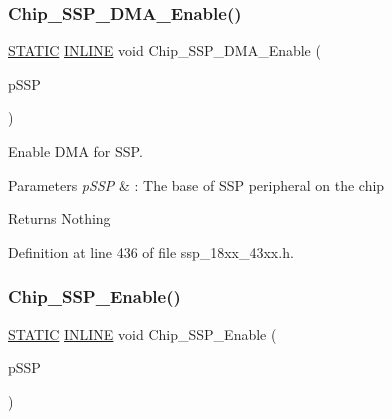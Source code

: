\subsubsection{\texorpdfstring{Chip\+\_\+\+S\+S\+P\+\_\+\+D\+M\+A\+\_\+\+Enable()}{Chip\_SSP\_DMA\_Enable()}}
{\footnotesize\ttfamily \hyperlink{group___l_p_c___types___public___macros_ga10b2d890d871e1489bb02b7e70d9bdfb}{S\+T\+A\+T\+IC} \hyperlink{spifi__18xx__43xx_8h_a2eb6f9e0395b47b8d5e3eeae4fe0c116}{I\+N\+L\+I\+NE} void Chip\+\_\+\+S\+S\+P\+\_\+\+D\+M\+A\+\_\+\+Enable (\begin{DoxyParamCaption}\item[{\hyperlink{struct_l_p_c___s_s_p___t}{L\+P\+C\+\_\+\+S\+S\+P\+\_\+T} $\ast$}]{p\+S\+SP }\end{DoxyParamCaption})}



Enable D\+MA for S\+SP. 


\begin{DoxyParams}{Parameters}
{\em p\+S\+SP} & \+: The base of S\+SP peripheral on the chip \\
\hline
\end{DoxyParams}
\begin{DoxyReturn}{Returns}
Nothing 
\end{DoxyReturn}


Definition at line 436 of file ssp\+\_\+18xx\+\_\+43xx.\+h.

\mbox{\label{group___s_s_p__18_x_x__43_x_x_gaf49b9a4689c9ae39bbd8c1ac20d31073}} 
\subsubsection{\texorpdfstring{Chip\+\_\+\+S\+S\+P\+\_\+\+Enable()}{Chip\_SSP\_Enable()}}
{\footnotesize\ttfamily \hyperlink{group___l_p_c___types___public___macros_ga10b2d890d871e1489bb02b7e70d9bdfb}{S\+T\+A\+T\+IC} \hyperlink{spifi__18xx__43xx_8h_a2eb6f9e0395b47b8d5e3eeae4fe0c116}{I\+N\+L\+I\+NE} void Chip\+\_\+\+S\+S\+P\+\_\+\+Enable (\begin{DoxyParamCaption}\item[{\hyperlink{struct_l_p_c___s_s_p___t}{L\+P\+C\+\_\+\+S\+S\+P\+\_\+T} $\ast$}]{p\+S\+SP }\end{DoxyParamCaption})}



